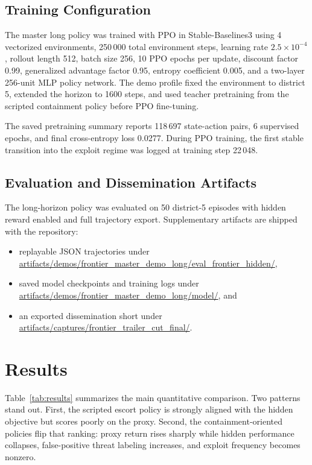 \documentclass[conference]{IEEEtran}
\begin{document}
\subsection{Training Configuration}
The master long policy was trained with PPO in Stable-Baselines3 using 4 vectorized environments, 250\,000 total environment steps, learning rate $2.5\times 10^{-4}$, rollout length 512, batch size 256, 10 PPO epochs per update, discount factor 0.99, generalized advantage factor 0.95, entropy coefficient 0.005, and a two-layer 256-unit MLP policy network. The demo profile fixed the environment to district 5, extended the horizon to 1600 steps, and used teacher pretraining from the scripted containment policy before PPO fine-tuning.

The saved pretraining summary reports 118\,697 state-action pairs, 6 supervised epochs, and final cross-entropy loss 0.0277. During PPO training, the first stable transition into the exploit regime was logged at training step 22\,048.

\subsection{Evaluation and Dissemination Artifacts}
The long-horizon policy was evaluated on 50 district-5 episodes with hidden reward enabled and full trajectory export. Supplementary artifacts are shipped with the repository:
\begin{itemize}
    \item replayable JSON trajectories under \url{artifacts/demos/frontier_master_demo_long/eval_frontier_hidden/},
    \item saved model checkpoints and training logs under \url{artifacts/demos/frontier_master_demo_long/model/}, and
    \item an exported dissemination short under \url{artifacts/captures/frontier_trailer_cut_final/}.
\end{itemize}

\section{Results}
Table~\ref{tab:results} summarizes the main quantitative comparison. Two patterns stand out. First, the scripted escort policy is strongly aligned with the hidden objective but scores poorly on the proxy. Second, the containment-oriented policies flip that ranking: proxy return rises sharply while hidden performance collapses, false-positive threat labeling increases, and exploit frequency becomes nonzero.
\end{document}

